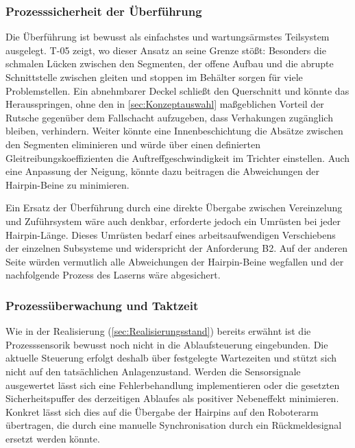 \subsubsection{Prozesssicherheit der Überführung}\label{sub:HF-Ueberfuehrung}
Die Überführung ist bewusst als einfachstes und wartungsärmstes Teilsystem ausgelegt. T-05 zeigt, wo dieser Ansatz an seine Grenze stößt: Besonders die
schmalen Lücken zwischen den Segmenten, der offene Aufbau und die abrupte Schnittstelle zwischen gleiten und stoppen im Behälter
sorgen für viele Problemstellen. Ein abnehmbarer Deckel schließt den Querschnitt und könnte das Herausspringen, ohne den 
in \cref{sec:Konzeptauswahl} maßgeblichen Vorteil der Rutsche gegenüber dem Fallschacht aufzugeben, dass Verhakungen 
zugänglich bleiben, verhindern. Weiter könnte eine Innenbeschichtung die Absätze zwischen den Segmenten eliminieren und 
würde über einen definierten Gleitreibungskoeffizienten die Auftreffgeschwindigkeit im Trichter einstellen. Auch 
eine Anpassung der Neigung, könnte dazu beitragen die Abweichungen der Hairpin-Beine zu minimieren.

Ein Ersatz der Überführung durch eine direkte Übergabe zwischen Vereinzelung und Zuführsystem wäre auch denkbar, 
erforderte jedoch ein Umrüsten bei jeder Hairpin-Länge. Dieses Umrüsten bedarf eines arbeitsaufwendigen Verschiebens der einzelnen
Subsysteme und widerspricht der Anforderung B2. Auf der anderen Seite würden vermutlich alle Abweichungen der Hairpin-Beine 
wegfallen und der nachfolgende Prozess des Laserns wäre abgesichert.

\subsubsection{Prozessüberwachung und Taktzeit}\label{sub:HF-Sensorik}
Wie in der Realisierung (\cref{sec:Realisierungsstand}) bereits erwähnt ist die Prozesssensorik bewusst noch nicht in die
Ablaufsteuerung eingebunden. Die aktuelle Steuerung erfolgt deshalb über festgelegte Wartezeiten und stützt sich nicht auf
den tatsächlichen Anlagenzustand. Werden die Sensorsignale ausgewertet lässt sich eine Fehlerbehandlung implementieren oder
die gesetzten Sicherheitspuffer des derzeitigen Ablaufes als positiver Nebeneffekt minimieren.
Konkret lässt sich dies auf die Übergabe der Hairpins auf den Roboterarm übertragen, die durch eine manuelle Synchronisation
durch ein Rückmeldesignal ersetzt werden könnte.

